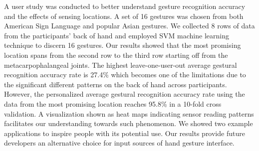 \documentclass{sigchi}
\begin{document}
A user study was conducted to better understand gesture recognition accuracy and the effects of sensing locations. A set of 16 gestures was chosen from both American Sign Language and popular Asian gestures. We collected 8 rows of data from the participants' back of hand and employed SVM machine learning technique to discern 16 gestures. Our results showed that the most promising location spans from the second row to the third row starting off from the metacarpophalangeal joints. The highest leave-one-user-out average gestural recognition accuracy rate is 27.4\% which becomes one of the limitations due to the significant different patterns on the back of hand across participants. However, the personalized average gestural recognition accuracy rate using the data from the most promising location reaches 95.8\% in a 10-fold cross validation. A visualization shown as heat maps indicating sensor reading patterns facilitates our understanding towards such phenomenon. We showed two example applications to inspire people with its potential use.
Our results provide future developers an alternative choice for input sources of hand gesture interface. 



%
%
%
%
%
\balance{}





\end{document}
